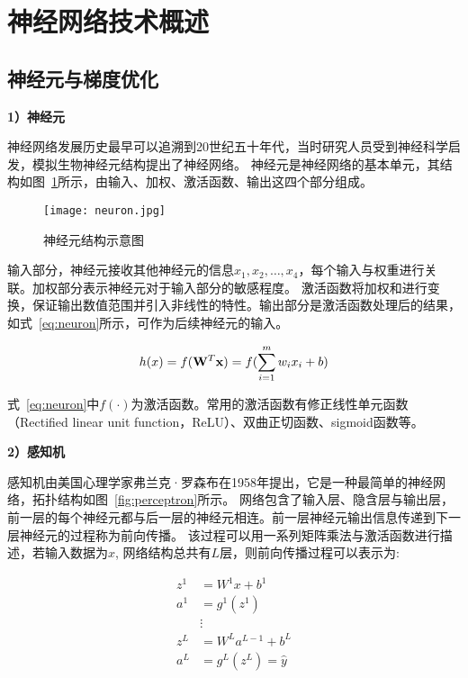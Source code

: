 \section{神经网络技术概述}
\subsection{神经元与梯度优化}

\textbf{1）神经元}

神经网络发展历史最早可以追溯到20世纪五十年代，当时研究人员受到神经科学启发，模拟生物神经元结构提出了神经网络。
神经元是神经网络的基本单元，其结构如图~\ref{fig:neuron}所示，由输入、加权、激活函数、输出这四个部分组成。
\begin{figure}
  \centering
  \texttt{[image: neuron.jpg]}
  \caption{神经元结构示意图}
  \label{fig:neuron}
\end{figure}

输入部分，神经元接收其他神经元的信息$x_1, x_2, \dots, x_4$，每个输入与权重进行关联。加权部分表示神经元对于输入部分的敏感程度。
激活函数将加权和进行变换，保证输出数值范围并引入非线性的特性。输出部分是激活函数处理后的结果，如式~\ref{eq:neuron}所示，可作为后续神经元的输入。

\begin{equation}
  h(x) = f({{\bf{W}}^T}{\bf{x}}) = f(\sum\limits_{i = 1}^m {{w_i}{x_i} + b})
  \label{eq:neuron}
\end{equation}

式~\ref{eq:neuron}中$f(\cdot)$为激活函数。常用的激活函数有修正线性单元函数（Rectified linear unit function，ReLU）、双曲正切函数、sigmoid函数等。

\textbf{2）感知机}

感知机由美国心理学家弗兰克·罗森布\cite{1958perceptron}在1958年提出，它是一种最简单的神经网络，拓扑结构如图~\ref{fig:perceptron}所示。
网络包含了输入层、隐含层与输出层，前一层的每个神经元都与后一层的神经元相连。前一层神经元输出信息传递到下一层神经元的过程称为前向传播。
该过程可以用一系列矩阵乘法与激活函数进行描述，若输入数据为$x$, 网络结构总共有$L$层，则前向传播过程可以表示为:

\begin{equation}
  \begin{aligned}
  z^{1} & =W^{1} x+b^{1} \\
  a^{1} & =g^{1}\left(z^{1}\right) \\
  & \vdots \\
  z^{L} & =W^{L} a^{L-1}+b^{L} \\
  a^{L} & =g^{L}\left(z^{L}\right)=\hat{y}
  \label{eq:perceptron}
\end{aligned}
\end{equation}

